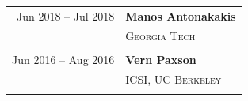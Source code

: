 \documentclass[10pt,singlecolumn]{article} %
\begin{document}
\begin{tabular}{rl}
Jun 2018 -- Jul 2018 & \textbf{Manos Antonakakis}\\
& \textsc{Georgia Tech}\\
&\\

Jun 2016 -- Aug 2016 & \textbf{Vern Paxson}\\
& \textsc{ICSI, UC Berkeley}\\
& \\

\end{tabular}


%
%	
	
\end{document}
